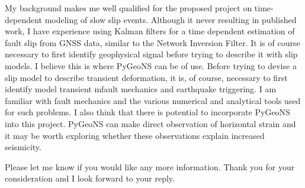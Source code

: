 \documentclass[11pt,a4paper,sans]{moderncv}
\begin{document}
My background makes me well qualified for the proposed project on time-dependent modeling of slow slip events. Although it never resulting in published work, I have experience using Kalman filters for a time dependent estimation of fault slip from GNSS data, similar to the Network Inversion Filter. It is of course necessary to first identify geophysical signal before trying to describe it with slip models. I believe this is where PyGeoNS can be of use. Before trying to devise a slip model to describe transient deformation, it is, of course, necessary to first identify model transient mfault mechanics and earthquake triggering. I am familiar with fault mechanics and the various numerical and analytical tools used for such problems. I also think that there is potential to incorporate PyGeoNS into this project. PyGeoNS can make direct observation of horizontal strain and it may be worth exploring whether these observations explain increased seismicity. 

Please let me know if you would like any more information. Thank you for your consideration and I look forward to your reply.                        

\makeletterclosing
\end{document}
